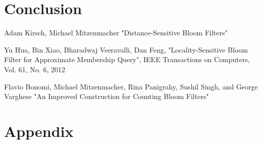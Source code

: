\documentclass[a4paper,11pt]{article}
\begin{document}



\section{Conclusion}
\newpage

\begin{thebibliography}{}

Adam Kirsch, Michael Mitzenmacher
"Distance-Sensitive Bloom Filters"

Yu Hua, Bin Xiao, Bharadwaj Veeravalli, Dan Feng, "Locality-Sensitive Bloom Filter for Approximate Membership Query", IEEE Transactions on Computers, Vol. 61, No. 6, 2012


Flavio Bonomi, Michael Mitzenmacher, Rina Panigrahy, Sushil Singh, and George Varghese
"An Improved Construction for Counting Bloom Filters"

\end{thebibliography}

\section*{Appendix}
%
\end{document}
